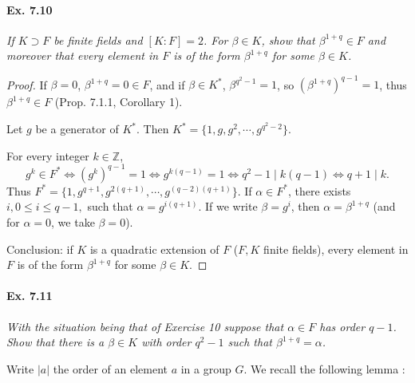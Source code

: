 \documentclass[11pt,a4paper]{article}
\newcommand{\Z}{\mathbb{Z}}
\begin{document}
\paragraph{Ex. 7.10}

{\it If $K \supset F$ be finite fields and $[K:F] = 2$. For $\beta \in K$, show that $\beta^{1+q} \in F$ and moreover that every element in $F$ is of the form $\beta^{1+q}$ for some $\beta \in K$.
}

\begin{proof}
If $\beta = 0$, $\beta^{1+q} = 0 \in F$, and if $\beta \in K^*$, $\beta^{q^2-1} = 1$, so $\left(\beta ^{1+q}\right)^{q-1} = 1$, thus $ \beta^{1+q} \in F$ (Prop. 7.1.1, Corollary 1).

Let  $g$ be a generator of $K^*$. Then $K^* = \{1,g,g^2,\cdots,g^{q^2-2}\}$.

For every integer $k \in \Z$, 
$$g^k  \in F^* \iff (g^k)^{q-1} = 1 \iff g^{k(q-1)}=1 \iff q^2-1 \mid k(q-1) \iff q+1 \mid k.$$
Thus $F^* = \{1,g^{q+1}, g^{2(q+1)},\cdots, g^{(q-2)(q+1)}\}$. If $\alpha \in F^*$, there exists $i, 0 \leq i \leq q-1,$ such that $\alpha = g^{i(q+1)}$.
If we write $\beta = g^i$, then $\alpha = \beta^{1+q}$ (and for $\alpha = 0$, we take $\beta = 0$).

Conclusion: if $K$ is a quadratic extension of $F$ ($F,K$ finite fields), every element in $F$ is of the form $\beta^{1+q}$ for some $\beta \in K$.
\end{proof}

\paragraph{Ex. 7.11}

{\it With the situation being that of Exercise 10 suppose that $\alpha \in F$ has order $q-1$. Show that there is a $\beta \in K$ with order $q^2-1$ such that $\beta^{1+q} = \alpha$.
}

\bigskip

Write $|a|$ the order of an element $a$ in a group $G$. We recall the following lemma :

\bigskip
\end{document}
